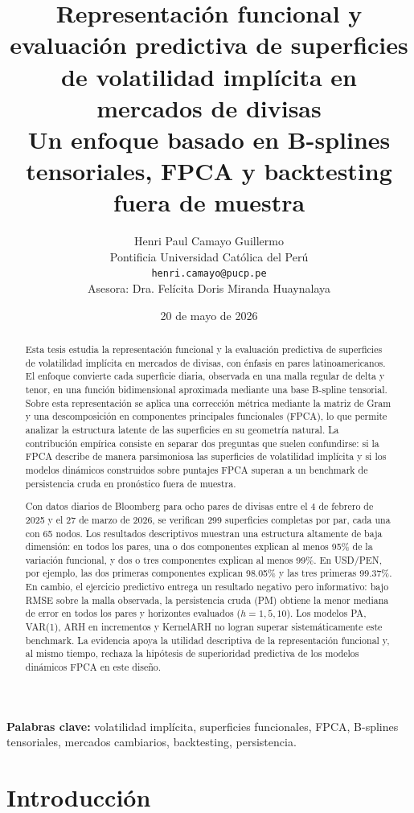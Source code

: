 \documentclass[12pt,a4paper]{article}
\title{\textbf{Representación funcional y evaluación predictiva de superficies de volatilidad implícita en mercados de divisas}\\
\large Un enfoque basado en B-splines tensoriales, FPCA y backtesting fuera de muestra}
\author{Henri Paul Camayo Guillermo\\
\small Pontificia Universidad Católica del Perú\\
\small \texttt{henri.camayo@pucp.pe}\\[0.5em]
\small Asesora: Dra. Felícita Doris Miranda Huaynalaya}
\date{20 de mayo de 2026}
\newcommand{\SVIs}{superficies de volatilidad implícita}
\begin{document}
\maketitle

\begin{abstract}
Esta tesis estudia la representación funcional y la evaluación predictiva de \SVIs{} en mercados de divisas, con énfasis en pares latinoamericanos. El enfoque convierte cada superficie diaria, observada en una malla regular de delta y tenor, en una función bidimensional aproximada mediante una base B-spline tensorial. Sobre esta representación se aplica una corrección métrica mediante la matriz de Gram y una descomposición en componentes principales funcionales (FPCA), lo que permite analizar la estructura latente de las superficies en su geometría natural. La contribución empírica consiste en separar dos preguntas que suelen confundirse: si la FPCA describe de manera parsimoniosa las \SVIs{} y si los modelos dinámicos construidos sobre puntajes FPCA superan a un benchmark de persistencia cruda en pronóstico fuera de muestra.

Con datos diarios de Bloomberg para ocho pares de divisas entre el 4 de febrero de 2025 y el 27 de marzo de 2026, se verifican 299 superficies completas por par, cada una con 65 nodos. Los resultados descriptivos muestran una estructura altamente de baja dimensión: en todos los pares, una o dos componentes explican al menos 95\% de la variación funcional, y dos o tres componentes explican al menos 99\%. En USD/PEN, por ejemplo, las dos primeras componentes explican 98.05\% y las tres primeras 99.37\%. En cambio, el ejercicio predictivo entrega un resultado negativo pero informativo: bajo RMSE sobre la malla observada, la persistencia cruda (PM) obtiene la menor mediana de error en todos los pares y horizontes evaluados (\(h=1,5,10\)). Los modelos PA, VAR(1), ARH en incrementos y KernelARH no logran superar sistemáticamente este benchmark. La evidencia apoya la utilidad descriptiva de la representación funcional y, al mismo tiempo, rechaza la hipótesis de superioridad predictiva de los modelos dinámicos FPCA en este diseño.
\end{abstract}

\textbf{Palabras clave:} volatilidad implícita, superficies funcionales, FPCA, B-splines tensoriales, mercados cambiarios, backtesting, persistencia.

\tableofcontents
\newpage

\section{Introducción}
\end{document}
